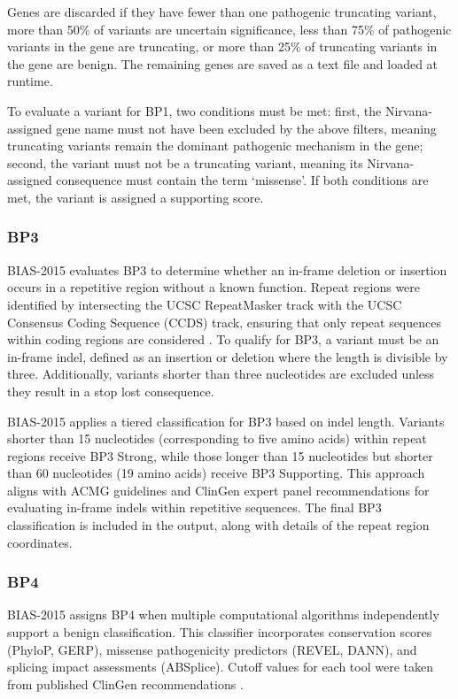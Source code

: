 \documentclass[unnumsec,webpdf,contemporary,large]{oup-authoring-template}
\theoremstyle{thmstyleone}
\theoremstyle{thmstyletwo}
\theoremstyle{thmstylethree}
\begin{document}
Genes are discarded if they have fewer than one pathogenic truncating variant, more than 50\% of variants are uncertain significance, less than 75\% of pathogenic variants in the gene are truncating, or more than 25\% of truncating variants in the gene are benign. The remaining genes are saved as a text file and loaded at runtime.

To evaluate a variant for BP1, two conditions must be met: first, the Nirvana-assigned gene name must not have been excluded by the above filters, meaning truncating variants remain the dominant pathogenic mechanism in the gene; second, the variant must not be a truncating variant, meaning its Nirvana-assigned consequence must contain the term ‘missense’. If both conditions are met, the variant is assigned a supporting score.

\subsubsection{BP3}
BIAS-2015 evaluates BP3 to determine whether an in-frame deletion or insertion occurs in a repetitive region without a known function. Repeat regions were identified by intersecting the UCSC RepeatMasker track with the UCSC Consensus Coding Sequence (CCDS) track, ensuring that only repeat sequences within coding regions are considered \cite{pruitt2014refseq, repeatmasker}. To qualify for BP3, a variant must be an in-frame indel, defined as an insertion or deletion where the length is divisible by three. Additionally, variants shorter than three nucleotides are excluded unless they result in a stop lost consequence.

BIAS-2015 applies a tiered classification for BP3 based on indel length. Variants shorter than 15 nucleotides (corresponding to five amino acids) within repeat regions receive BP3 Strong, while those longer than 15 nucleotides but shorter than 60 nucleotides (19 amino acids) receive BP3 Supporting. This approach aligns with ACMG guidelines and ClinGen expert panel recommendations for evaluating in-frame indels within repetitive sequences. The final BP3 classification is included in the output, along with details of the repeat region coordinates.

\subsubsection{BP4}
BIAS-2015 assigns BP4 when multiple computational algorithms independently support a benign classification. This classifier incorporates conservation scores (PhyloP, GERP), missense pathogenicity predictors (REVEL, DANN), and splicing impact assessments (ABSplice). Cutoff values for each tool were taken from published ClinGen recommendations \cite{pejaver2022pp3bp4}.
\end{document}

